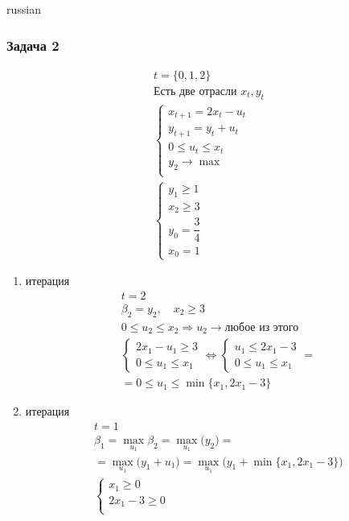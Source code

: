\documentclass{article}
\begin{document}
\begin{otherlanguage*}{russian}
\subsubsection*{Задача 2}
\begin{align*}
t = \{ 0, 1, 2 \} \\
\text{Есть две отрасли } x_t, y_t \\
\begin{cases}
x_{t+1} = 2 x_t - u_t \\
y_{t+1} = y_t + u_t \\
0 \le u_t \le x_t \\
y_2 \rightarrow \max \\
\end{cases} \\
\begin{cases}
y_1 \ge 1 \\
x_2 \ge 3 \\
y_0 = \dfrac{3}{4} \\
x_0 = 1 
\end{cases}
\end{align*}
\begin{enumerate}
\item итерация 
\begin{align*}
t = 2 \\ 
\beta_2 = y_2, \,\,\,\,\,\,x_2 \ge 3 \\
0 \le u_2 \le x_2 \Rightarrow u_2 \rightarrow \text{любое из этого } \\
\begin{cases}
2 x_1 - u_1 \ge 3  \\
0 \le u_1 \le x_1 
\end{cases} \Leftrightarrow \begin{cases}
u_1 \le 2 x_1 - 3 \\
0 \le u_1 \le x_1 
\end{cases} = \\
= 0 \le u_1 \le \min \{x_1, 2x_1 - 3  \}
\end{align*}
\item итерация
\begin{align*}
t =1  \\ 
\beta_1 = \max_{u_1} \beta_2 = \max_{u_1} \Big( y_2 \Big)  = \\ = \max_{u_1} \Big( y_1 + u_1  \Big) = \max_{u_1} \Big( y_1 + \min \{ x_1, 2x_1 - 3  \} \Big) \\
\begin{cases}
x_1 \ge 0 \\
2 x_1 - 3 \ge 0 \\

\end{cases}
\end{align*}
\end{enumerate}
\end{otherlanguage*}
\end{document}
